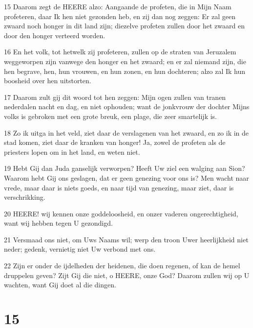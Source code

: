 \par 15 Daarom zegt de HEERE alzo: Aangaande de profeten, die in Mijn Naam profeteren, daar Ik hen niet gezonden heb, en zij dan nog zeggen: Er zal geen zwaard noch honger in dit land zijn; diezelve profeten zullen door het zwaard en door den honger verteerd worden.
\par 16 En het volk, tot hetwelk zij profeteren, zullen op de straten van Jeruzalem weggeworpen zijn vanwege den honger en het zwaard; en er zal niemand zijn, die hen begrave, hen, hun vrouwen, en hun zonen, en hun dochteren; alzo zal Ik hun boosheid over hen uitstorten.
\par 17 Daarom zult gij dit woord tot hen zeggen: Mijn ogen zullen van tranen nederdalen nacht en dag, en niet ophouden; want de jonkvrouw der dochter Mijns volks is gebroken met een grote breuk, een plage, die zeer smartelijk is.
\par 18 Zo ik uitga in het veld, ziet daar de verslagenen van het zwaard, en zo ik in de stad komen, ziet daar de kranken van honger! Ja, zowel de profeten als de priesters lopen om in het land, en weten niet.
\par 19 Hebt Gij dan Juda ganselijk verworpen? Heeft Uw ziel een walging aan Sion? Waarom hebt Gij ons geslagen, dat er geen genezing voor ons is? Men wacht naar vrede, maar daar is niets goeds, en naar tijd van genezing, maar ziet, daar is verschrikking.
\par 20 HEERE! wij kennen onze goddeloosheid, en onzer vaderen ongerechtigheid, want wij hebben tegen U gezondigd.
\par 21 Versmaad ons niet, om Uws Naams wil; werp den troon Uwer heerlijkheid niet neder; gedenk, vernietig niet Uw verbond met ons.
\par 22 Zijn er onder de ijdelheden der heidenen, die doen regenen, of kan de hemel druppelen geven? Zijt Gij die niet, o HEERE, onze God? Daarom zullen wij op U wachten, want Gij doet al die dingen.

\chapter{15}


